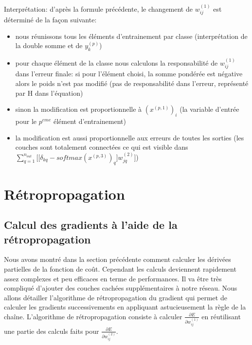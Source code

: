 \documentclass[a4paper,11pt,oneside,roman]{article}
\begin{document}
    Interprétation:
    d'après la formule précédente, le changement de $w_{ij}^{(1)}$ est déterminé de la façon suivante:
    \begin{itemize}
        \item nous réunissons tous les éléments d'entrainement par classe (interprétation de la double somme et de $y_k^{(p)}$)
        \item pour chaque élément de la classe nous calculons la responsabilité de $w_{ij}^{(1)}$ dans l'erreur finale: si pour l'élément choisi, la somme pondérée est négative alors le poids n'est pas modifié (pas de responsabilité dans l'erreur, représenté par H dans l'équation)
        \item sinon la modification est proportionnelle à $(x^{(p,1)})_i$ (la variable d'entrée pour le $p^{eme}$ élément d'entrainement) 
        \item la modification est aussi proportionnelle aux erreurs de toutes les sorties (les couches sont totalement connectées ce qui est visible dans $\sum\limits_{q=1}^{n_{out}} \bigg[ \big[ \delta_{kq} - softmax(x^{(p,3)})_q \big] w_{jq}^{(2)} \bigg]$)
    \end{itemize}

    \section{Rétropropagation}
    \subsection{Calcul des gradients à l'aide de la rétropropagation}
    Nous avons montré dans la section précédente comment calculer les dérivées partielles de la fonction de coût. Cependant les calculs deviennent rapidement assez complexes et peu efficaces en terme de performances.
    Il va être très compliqué d'ajouter des couches cachées supplémentaires à notre réseau.
    Nous allons détailler l'algorithme de rétropropagation du gradient qui permet de calculer les gradients successivements en appliquant astucieusement la règle de la chaîne.
    L'algorithme de rétropropagation consiste à calculer $\frac{\partial E}{\partial w_{ij}^{(1)}}$ en réutilisant une partie des calculs faits pour $\frac{\partial E}{\partial w_{ij}^{(2)}}$.
\end{document}
